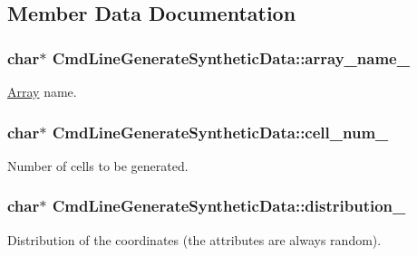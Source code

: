 \subsection{Member Data Documentation}
\hypertarget{classCmdLineGenerateSyntheticData_a0bbd0609020f2ba9d19d3db9edd5995a}{}
\subsubsection[{array\+\_\+name\+\_\+}]{\setlength{\rightskip}{0pt plus 5cm}char$\ast$ Cmd\+Line\+Generate\+Synthetic\+Data\+::array\+\_\+name\+\_\+}\label{classCmdLineGenerateSyntheticData_a0bbd0609020f2ba9d19d3db9edd5995a}
\hyperlink{classArray}{Array} name. \hypertarget{classCmdLineGenerateSyntheticData_a5e0cdd8500788a07ceb43f0e365d9393}{}
\subsubsection[{cell\+\_\+num\+\_\+}]{\setlength{\rightskip}{0pt plus 5cm}char$\ast$ Cmd\+Line\+Generate\+Synthetic\+Data\+::cell\+\_\+num\+\_\+}\label{classCmdLineGenerateSyntheticData_a5e0cdd8500788a07ceb43f0e365d9393}
Number of cells to be generated. \hypertarget{classCmdLineGenerateSyntheticData_ae046552046c64fc914b5114ee74f0108}{}
\subsubsection[{distribution\+\_\+}]{\setlength{\rightskip}{0pt plus 5cm}char$\ast$ Cmd\+Line\+Generate\+Synthetic\+Data\+::distribution\+\_\+}\label{classCmdLineGenerateSyntheticData_ae046552046c64fc914b5114ee74f0108}
Distribution of the coordinates (the attributes are always random). \hypertarget{classCmdLineGenerateSyntheticData_a2c3b1ab6214ade821d8eabf55cbc5307}{}
